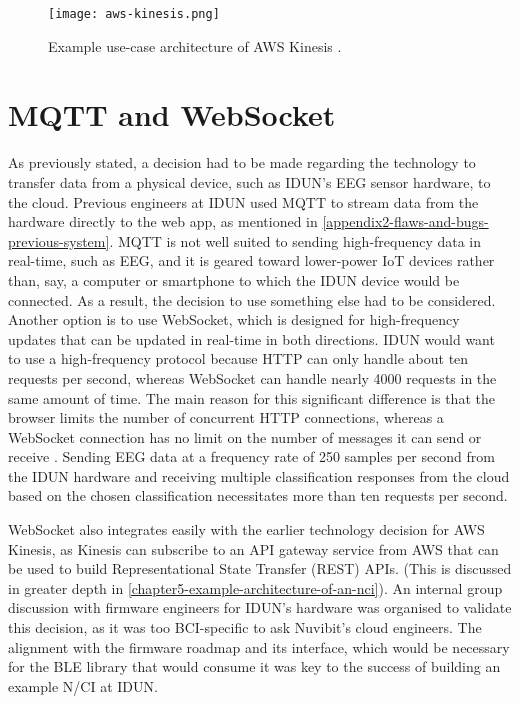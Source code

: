\begin{figure}[!ht]
  \centering
  \texttt{[image: aws-kinesis.png]}
  \caption[Example use-case architecture of AWS Kinesis.]{Example use-case architecture of AWS Kinesis \citep{amazon_web_services_inc_amazon_nodate}.}
  \label{fig:aws-kinesis}
\end{figure}

\section*{MQTT and WebSocket}
\label{chapter4-mqtt-and-websocket}

As previously stated, a decision had to be made regarding the technology to transfer data from a physical device, such as IDUN’s EEG sensor hardware, to the cloud. Previous engineers at IDUN used MQTT to stream data from the hardware directly to the web app, as mentioned in \autoref{appendix2-flaws-and-bugs-previous-system}. MQTT is not well suited to sending high-frequency data in real-time, such as EEG, and it is geared toward lower-power IoT devices rather than, say, a computer or smartphone to which the IDUN device would be connected. As a result, the decision to use something else had to be considered. Another option is to use WebSocket, which is designed for high-frequency updates that can be updated in real-time in both directions. IDUN would want to use a high-frequency protocol because HTTP can only handle about ten requests per second, whereas WebSocket can handle nearly 4000 requests in the same amount of time. The main reason for this significant difference is that the browser limits the number of concurrent HTTP connections, whereas a WebSocket connection has no limit on the number of messages it can send or receive \citep{luecke_http_2018}. Sending EEG data at a frequency rate of 250 samples per second from the IDUN hardware and receiving multiple classification responses from the cloud based on the chosen classification necessitates more than ten requests per second.

WebSocket also integrates easily with the earlier technology decision for AWS Kinesis, as Kinesis can subscribe to an API gateway service from AWS that can be used to build Representational State Transfer (REST) APIs. (This is discussed in greater depth in \autoref{chapter5-example-architecture-of-an-nci}). An internal group discussion with firmware engineers for IDUN’s hardware was organised to validate this decision, as it was too BCI-specific to ask Nuvibit’s cloud engineers. The alignment with the firmware roadmap and its interface, which would be necessary for the BLE library that would consume it was key to the success of building an example N/CI at IDUN.

